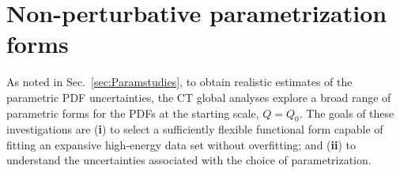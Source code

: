 \section{Non-perturbative parametrization forms}
\label{sec:AppendixParam}
%
%
%
As noted in Sec.~\ref{sec:Paramstudies}, to obtain realistic estimates of the parametric PDF uncertainties, the CT global analyses explore a broad range of parametric forms for the PDFs at the starting scale, $Q\! =\! Q_0$. The goals
of these investigations are ({\bf i}) to select a sufficiently flexible functional form capable of fitting an
expansive high-energy data set without overfitting; and ({\bf ii}) to understand the uncertainties 
associated with the choice of parametrization.

%
%
%
%
%
%
%
%
